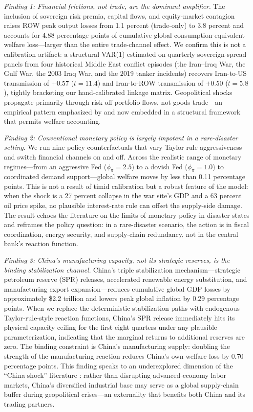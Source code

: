 \documentclass[12pt,a4paper]{article}
\begin{document}
\textit{Finding 1: Financial frictions, not trade, are the dominant amplifier.} The inclusion of sovereign risk premia, capital flows, and equity-market contagion raises ROW peak output losses from 1.1 percent (trade-only) to 3.8 percent and accounts for 4.88 percentage points of cumulative global consumption-equivalent welfare loss---larger than the entire trade-channel effect. We confirm this is not a calibration artifact: a structural VAR(1) estimated on quarterly sovereign-spread panels from four historical Middle East conflict episodes (the Iran--Iraq War, the Gulf War, the 2003 Iraq War, and the 2019 tanker incidents) recovers Iran-to-US transmission of $+0.57$ ($t = 11.4$) and Iran-to-ROW transmission of $+0.50$ ($t = 5.8$), tightly bracketing our hand-calibrated linkage matrix. Geopolitical shocks propagate primarily through risk-off portfolio flows, not goods trade---an empirical pattern emphasized by \citet{caldara2022measuring} and now embedded in a structural framework that permits welfare accounting.

\textit{Finding 2: Conventional monetary policy is largely impotent in a rare-disaster setting.} We run nine policy counterfactuals that vary Taylor-rule aggressiveness and switch financial channels on and off. Across the realistic range of monetary regimes---from an aggressive Fed ($\phi_\pi = 2.5$) to a dovish Fed ($\phi_\pi = 1.0$) to coordinated demand support---global welfare moves by less than 0.11 percentage points. This is not a result of timid calibration but a robust feature of the model: when the shock is a 27 percent collapse in the war site's GDP and a 63 percent oil price spike, no plausible interest-rate rule can offset the supply-side damage. The result echoes the literature on the limits of monetary policy in disaster states \citep{barro2006rare} and reframes the policy question: in a rare-disaster scenario, the action is in fiscal coordination, energy security, and supply-chain redundancy, not in the central bank's reaction function.

\textit{Finding 3: China's manufacturing capacity, not its strategic reserves, is the binding stabilization channel.} China's triple stabilization mechanism---strategic petroleum reserve (SPR) releases, accelerated renewable energy substitution, and manufacturing export expansion---reduces cumulative global GDP losses by approximately \$2.2 trillion and lowers peak global inflation by 0.29 percentage points. When we replace the deterministic stabilization paths with endogenous Taylor-rule-style reaction functions, China's SPR release immediately hits its physical capacity ceiling for the first eight quarters under any plausible parameterization, indicating that the marginal returns to additional reserves are zero. The binding constraint is China's manufacturing supply: doubling the strength of the manufacturing reaction reduces China's own welfare loss by 0.70 percentage points. This finding speaks to an underexplored dimension of the ``China shock'' literature \citep{autor2013china}: rather than disrupting advanced-economy labor markets, China's diversified industrial base may serve as a global supply-chain buffer during geopolitical crises---an externality that benefits both China and its trading partners.
\end{document}
